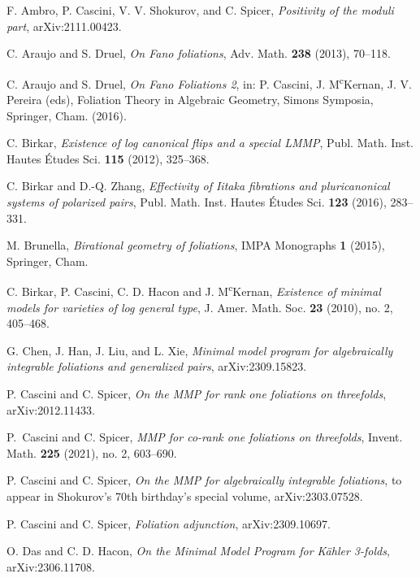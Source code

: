 \documentclass[11pt]{amsart}
\numberwithin{equation}{section}
\theoremstyle{definition}
\theoremstyle{definition}
\theoremstyle{definition}
\begin{document}
\begin{thebibliography}{99}
 F. Ambro, P. Cascini, V. V. Shokurov, and C. Spicer, \textit{Positivity of the moduli part}, arXiv:2111.00423.

 C. Araujo and S. Druel, \textit{On Fano foliations}, Adv. Math. \textbf{238} (2013), 70--118.

 C. Araujo and S. Druel, \textit{On Fano Foliations 2}, in: P. Cascini, J. M\textsuperscript{c}Kernan, J. V. Pereira (eds), Foliation Theory in Algebraic Geometry, Simons Symposia, Springer, Cham. (2016).


 C. Birkar, \textit{Existence of log canonical flips and a special LMMP}, Publ. Math. Inst. Hautes \'Etudes Sci. \textbf{115} (2012), 325--368.

 C. Birkar and D.-Q. Zhang, \textit{Effectivity of Iitaka fibrations and pluricanonical systems of polarized pairs}, Publ. Math. Inst. Hautes \'Etudes Sci. \textbf{123} (2016), 283--331.

 M. Brunella, \textit{Birational geometry of foliations}, IMPA Monographs \textbf{1} (2015), Springer, Cham.

 C. Birkar, P. Cascini, C. D. Hacon and J. M\textsuperscript{c}Kernan, \textit{Existence of minimal models for varieties of log general type}, J. Amer. Math. Soc. \textbf{23} (2010), no. 2, 405--468.

 G. Chen, J. Han, J. Liu, and L. Xie, \textit{Minimal model program for algebraically integrable foliations and generalized pairs}, arXiv:2309.15823. 


 P. Cascini and C. Spicer, \textit{On the MMP for rank one foliations on threefolds}, arXiv:2012.11433.

 P.~Cascini and C. Spicer, \textit{MMP for co-rank one foliations on threefolds}, Invent. Math. \textbf{225} (2021), no. 2, 603–690.

 P. Cascini and C. Spicer, \textit{On the MMP for algebraically integrable foliations}, to appear in Shokurov's 70th birthday's special volume, arXiv:2303.07528.

 P. Cascini and C. Spicer, \textit{Foliation adjunction}, arXiv:2309.10697.



 O. Das and C. D. Hacon, \textit{On the Minimal Model Program for K\"ahler 3-folds}, arXiv:2306.11708.


\end{thebibliography}
\end{document}

